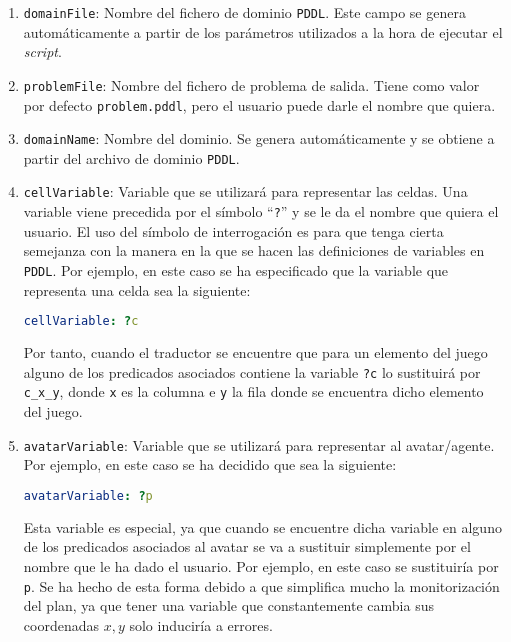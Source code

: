 \begin{enumerate}
    \item \texttt{domainFile}: Nombre del fichero de dominio \texttt{PDDL}. Este campo se genera
    automáticamente a partir de los parámetros utilizados a la hora de ejecutar el \textit{script}.
    
    \item \texttt{problemFile}: Nombre del fichero de problema de salida. Tiene como valor por defecto
    \texttt{problem.pddl}, pero el usuario puede darle el nombre que quiera.
    
    \item \texttt{domainName}: Nombre del dominio. Se genera automáticamente y se obtiene a partir del
    archivo de dominio \texttt{PDDL}.
    
    \item \texttt{cellVariable}: Variable que se utilizará para representar las celdas. Una variable
    viene precedida por el símbolo ``\texttt{?}'' y se le da el nombre que quiera el usuario. El uso del símbolo
    de interrogación es para que tenga cierta semejanza con la manera en la que se hacen las definiciones
    de variables en \texttt{PDDL}. Por ejemplo, en este caso se ha especificado que la variable que representa
    una celda sea la siguiente:
    
    \begin{lstlisting}[language=yaml]
cellVariable: ?c
    \end{lstlisting}
    
    Por tanto, cuando el traductor se encuentre que para un elemento del juego alguno de los predicados
    asociados contiene la variable \texttt{?c} lo sustituirá por \texttt{c\_x\_y}, donde \texttt{x} es
    la columna e \texttt{y} la fila donde se encuentra dicho elemento del juego.
    
    \item \texttt{avatarVariable}: Variable que se utilizará para representar al avatar/agente. Por
    ejemplo, en este caso se ha decidido que sea la siguiente:
    
    \begin{lstlisting}[language=yaml]
avatarVariable: ?p
    \end{lstlisting}
    
    Esta variable es especial, ya que cuando se encuentre dicha variable en alguno de los predicados asociados
    al avatar se va a sustituir simplemente por el nombre que le ha dado el usuario. Por ejemplo,
    en este caso se sustituiría por \texttt{p}. Se ha hecho de esta forma debido a que simplifica
    mucho la monitorización del plan, ya que tener una variable que constantemente cambia sus coordenadas
    $x,y$ solo induciría a errores.
    

\end{enumerate}
